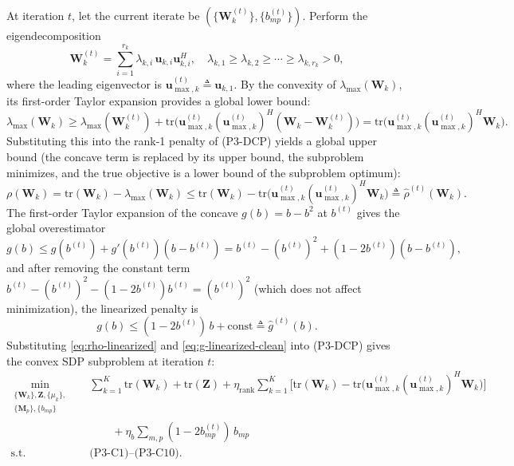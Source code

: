 \documentclass[12pt,a4paper]{article}
\newcommand{\vect}[1]{\mathbf{#1}}
\newcommand{\mat}[1]{\mathbf{#1}}
\newcommand{\tr}{\text{tr}}
\begin{document}
At iteration $t$, let the current iterate be $(\{\mat{W}_k^{(t)}\}, \{b_{mp}^{(t)}\})$. Perform the eigendecomposition
\begin{equation}
\mat{W}_k^{(t)} = \sum_{i=1}^{r_k} \lambda_{k,i} \, \vect{u}_{k,i} \vect{u}_{k,i}^H, \quad \lambda_{k,1} \geq \lambda_{k,2} \geq \cdots \geq \lambda_{k,r_k} > 0,
\end{equation}
where the leading eigenvector is $\vect{u}_{\max,k}^{(t)} \triangleq \vect{u}_{k,1}$. By the convexity of $\lambda_{\max}(\mat{W}_k)$, its first-order Taylor expansion provides a global lower bound:
\begin{equation}\label{eq:lambda-lb}
\lambda_{\max}(\mat{W}_k) \geq \lambda_{\max}(\mat{W}_k^{(t)}) + \tr\Big( \vect{u}_{\max,k}^{(t)} (\vect{u}_{\max,k}^{(t)})^H (\mat{W}_k - \mat{W}_k^{(t)}) \Big) = \tr\Big( \vect{u}_{\max,k}^{(t)} (\vect{u}_{\max,k}^{(t)})^H \mat{W}_k \Big).
\end{equation}
Substituting this into the rank-1 penalty of (P3-DCP) yields a global upper bound (the concave term is replaced by its upper bound, the subproblem minimizes, and the true objective is a lower bound of the subproblem optimum):
\begin{equation}\label{eq:rho-linearized}
\rho(\mat{W}_k) = \tr(\mat{W}_k) - \lambda_{\max}(\mat{W}_k) \leq \tr(\mat{W}_k) - \tr\Big( \vect{u}_{\max,k}^{(t)} (\vect{u}_{\max,k}^{(t)})^H \mat{W}_k \Big) \triangleq \hat{\rho}^{(t)}(\mat{W}_k).
\end{equation}
The first-order Taylor expansion of the concave $g(b) = b - b^2$ at $b^{(t)}$ gives the global overestimator
\begin{equation}\label{eq:g-linearized}
g(b) \leq g(b^{(t)}) + g'(b^{(t)})(b - b^{(t)}) = b^{(t)} - (b^{(t)})^2 + (1 - 2b^{(t)})(b - b^{(t)}),
\end{equation}
and after removing the constant term $b^{(t)} - (b^{(t)})^2 - (1 - 2b^{(t)}) b^{(t)} = (b^{(t)})^2$ (which does not affect minimization), the linearized penalty is
\begin{equation}\label{eq:g-linearized-clean}
g(b) \leq (1 - 2b^{(t)}) \, b + \text{const} \triangleq \hat{g}^{(t)}(b).
\end{equation}
Substituting \eqref{eq:rho-linearized} and \eqref{eq:g-linearized-clean} into (P3-DCP) gives the convex SDP subproblem at iteration $t$:
\begin{equation}\label{eq:p3-sca}
\begin{aligned}
\min_{\substack{\{\mat{W}_k\}, \mat{Z}, \{\mu_k\}, \\ \{\mat{M}_p\}, \{b_{mp}\}}} \quad & \sum_{k=1}^K \tr(\mat{W}_k) + \tr(\mat{Z}) + \eta_{\text{rank}} \sum_{k=1}^K \Big[ \tr(\mat{W}_k) - \tr\big( \vect{u}_{\max,k}^{(t)} (\vect{u}_{\max,k}^{(t)})^H \mat{W}_k \big) \Big] \\
& \qquad + \eta_b \sum_{m, p} (1 - 2b_{mp}^{(t)}) \, b_{mp} \\
\text{s.t.} \quad & \text{(P3-C1)--(P3-C10)}.
\end{aligned}
\end{equation}
\end{document}
